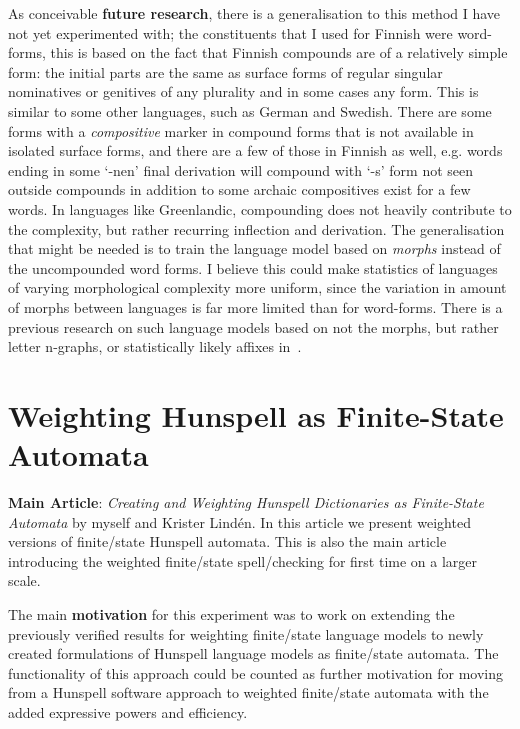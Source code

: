 \documentclass[officiallayout]{unihelcompling}
\begin{document}
As conceivable \textbf{future research}, there is a generalisation to this
method I have not yet experimented with; the constituents that I used for
Finnish were word-forms, this is based on the fact that Finnish compounds are
of a relatively simple form: the initial parts are the same as surface forms of
regular singular nominatives or genitives of any plurality and in some cases
any form. This is similar to some other languages, such as German and Swedish.
There are some forms with a \emph{compositive} marker in compound forms that is
not available in isolated surface forms, and there are a few of those in
Finnish as well, e.g.\/ words ending in some `-nen' final derivation will
compound with `-s' form not seen outside compounds in addition to some archaic
compositives exist for a few words.  In languages like Greenlandic, compounding
does not heavily contribute to the complexity, but rather recurring inflection
and derivation. The generalisation that might be needed is to train the
language model based on \emph{morphs} instead of the uncompounded word forms.
I believe this could make statistics of languages of varying morphological
complexity more uniform, since the variation in amount of morphs between
languages is far more limited than for word-forms. There is a previous research
on such language models based on not the morphs, but rather letter n-graphs, or
statistically likely affixes in~\citet{creutz2005morfessor}.


\section{Weighting Hunspell as Finite-State Automata}
\label{sec:hunspell-training}

\textbf{Main Article}: \emph{Creating and Weighting Hunspell Dictionaries as
Finite-State Automata} by myself and Krister Lindén. In this article we present
weighted versions of finite\-/state Hunspell automata. This is also the main
article introducing the weighted finite\-/state spell\-/checking for first time
on a larger scale.

The main \textbf{motivation} for this experiment was to work on extending the
previously verified results for weighting finite\-/state language models to newly
created formulations of Hunspell language models as finite\-/state automata. The
functionality of this approach could be counted as further motivation for
moving from a Hunspell software approach to weighted finite\-/state automata with
the added expressive powers and efficiency.
\end{document}
